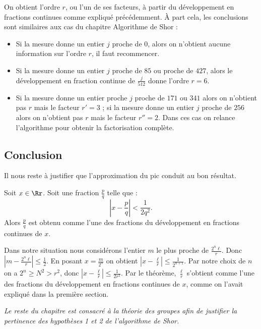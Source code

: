 \documentclass[11pt,class=report,crop=false]{standalone}
\begin{document}
On obtient l'ordre $r$, ou l'un de ses facteurs, à partir du développement en fractions continues comme expliqué précédemment. \`A part cela, les conclusions sont similaires aux cas du chapitre \og{}Algorithme de Shor\fg{} :

\begin{itemize}
  \item Si la mesure donne un entier $j$ proche de $0$, alors on n'obtient aucune information sur l'ordre $r$, il faut recommencer.
  \item Si la mesure donne un entier $j$ proche de $85$ ou proche de $427$, alors le développement en fraction continue de $\frac{j}{512}$ donne l'ordre $r=6$.
  \item Si la mesure donne un entier proche $j$ proche de $171$ ou $341$ alors on n'obtient pas $r$ mais le facteur $r'=3$ ; si la mesure donne un entier $j$ proche de $256$ alors on n'obtient pas $r$ mais le facteur $r''=2$. Dans ces cas on relance l'algorithme pour obtenir la factorisation complète.
\end{itemize}


\subsection{Conclusion}

Il nous reste à justifier que l'approximation du pic conduit au bon résultat.

\begin{theoreme}
Soit $x \in \Rr$. Soit une fraction $\frac{p}{q}$ telle que :
$$\left| x - \frac{p}{q} \right| < \frac{1}{2q^2}.$$
Alors $\frac{p}{q}$ est obtenu comme l'une des fractions du développement en fractions continues de $x$.
\end{theoreme}

Dans notre situation nous considérons l'entier $m$ le plus proche de $\frac{2^n\ell}{r}$. Donc $\left|m- \frac{2^n\ell}{r}\right| \le \frac12$.
En posant $x = \frac{m}{2^n}$ on obtient $\left|x- \frac{\ell}{r}\right| \le \frac1{2^{n+1}}$.
Par notre choix de $n$ on a $2^n \ge N^2 > r^2$, donc $\left|x- \frac{\ell}{r}\right| \le \frac1{2r^2}$. Par le théorème, $\frac{\ell}{r}$ s'obtient comme l'une des fractions du développement en fractions continues de $x$, comme on l'avait expliqué dans la première section.

\bigskip

\emph{Le reste du chapitre est consacré à la théorie des groupes afin de justifier la pertinence des hypothèses 1 et 2 de l'algorithme de Shor.}
\end{document}

